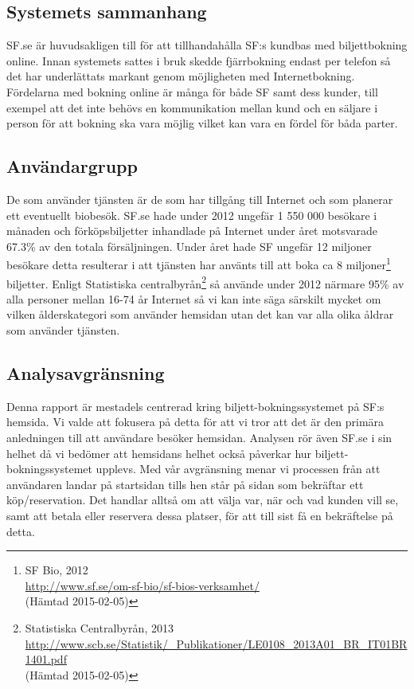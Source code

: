 \documentclass[swedish,a4paper,11pt]{article}
\begin{document}
\subsection{Systemets sammanhang} 
SF.se är huvudsakligen till för att tillhandahålla SF:s kundbas med biljettbokning online. Innan systemets sattes i bruk skedde fjärrbokning endast per telefon så det har underlättats markant genom möjligheten med Internetbokning. Fördelarna med bokning online är många för både SF samt dess kunder, till exempel att det inte behövs en kommunikation mellan kund och en säljare i person för att bokning ska vara möjlig vilket kan vara en fördel för båda parter.

\subsection{Användargrupp} 
De som använder tjänsten är de som har tillgång till Internet och som planerar ett eventuellt biobesök. SF.se hade under 2012 ungefär 1 550 000 besökare i månaden och förköpsbiljetter inhandlade på Internet under året motsvarade 67.3\% av den totala försäljningen. Under året hade SF ungefär 12 miljoner besökare detta resulterar i att tjänsten har använts till att boka ca 8 miljoner\footnote{SF Bio, 2012  \\
\url{http://www.sf.se/om-sf-bio/sf-bios-verksamhet/}\\ (Hämtad 2015-02-05)} biljetter. Enligt Statistiska centralbyrån\footnote{ Statistiska Centralbyrån, 2013\\ \url{http://www.scb.se/Statistik/_Publikationer/LE0108_2013A01_BR_IT01BR1401.pdf} \\ (Hämtad 2015-02-05)} så använde under 2012 närmare 95\% av alla personer mellan 16-74 år Internet så vi kan inte säga särskilt mycket om vilken ålderskategori som använder hemsidan utan det kan var alla olika åldrar som använder tjänsten.

\subsection{Analysavgränsning}
Denna rapport är mestadels centrerad kring biljett-bokningssystemet på SF:s hemsida. Vi valde att fokusera på detta för att vi tror att det är den primära anledningen till att användare besöker hemsidan. Analysen rör även SF.se i sin helhet då vi bedömer att hemsidans helhet också påverkar hur biljett-bokningssystemet upplevs. Med vår avgränsning menar vi processen från att användaren landar på startsidan tills hen står på sidan som bekräftar ett köp/reservation. Det handlar alltså om att välja var, när och vad kunden vill se, samt att betala eller reservera dessa platser, för att till sist få en bekräftelse på detta.
\end{document}
